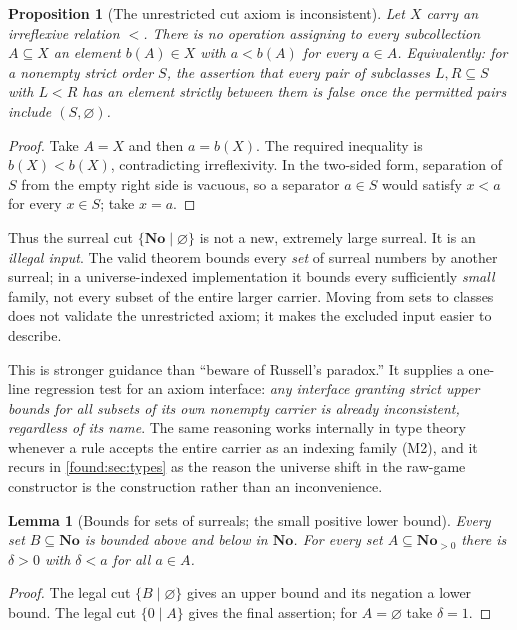 \documentclass[11pt,letterpaper]{article}
\numberwithin{equation}{section}
\newtheorem{proposition}[theorem]{Proposition}
\newtheorem{lemma}[theorem]{Lemma}
\theoremstyle{definition}
\theoremstyle{remark}
\newcommand{\No}{\mathbf{No}}
\begin{document}
\begin{proposition}[The unrestricted cut axiom is inconsistent]\label{found:prop:allcuts}
Let $X$ carry an irreflexive relation $<$. There is no operation assigning to
every subcollection $A\subseteq X$ an element $b(A)\in X$ with $a<b(A)$ for
every $a\in A$. Equivalently: for a nonempty strict order $S$, the assertion
that every pair of subclasses $L,R\subseteq S$ with $L<R$ has an element
strictly between them is false once the permitted pairs include
$(S,\varnothing)$.
\end{proposition}
\begin{proof}
Take $A=X$ and then $a=b(X)$. The required inequality is $b(X)<b(X)$,
contradicting irreflexivity. In the two-sided form, separation of $S$ from the
empty right side is vacuous, so a separator $a\in S$ would satisfy $x<a$ for
every $x\in S$; take $x=a$.
\end{proof}

Thus the surreal cut $\{\No\mid\varnothing\}$ is not a new, extremely large
surreal. It is an \emph{illegal input}. The valid theorem bounds every
\emph{set} of surreal numbers by another surreal; in a universe-indexed
implementation it bounds every sufficiently \emph{small} family, not every
subset of the entire larger carrier. Moving from sets to classes does not
validate the unrestricted axiom; it makes the excluded input easier to
describe.

This is stronger guidance than ``beware of Russell's paradox.'' It supplies a
one-line regression test for an axiom interface: \emph{any interface granting
strict upper bounds for all subsets of its own nonempty carrier is already
inconsistent, regardless of its name}. The same reasoning works internally in
type theory whenever a rule accepts the entire carrier as an indexing family
(M2), and it recurs in \cref{found:sec:types} as the reason the universe shift
in the raw-game constructor is the construction rather than an inconvenience.

\begin{lemma}[Bounds for sets of surreals; the small positive lower bound]\label{found:lem:bounds}
Every set $B\subseteq\No$ is bounded above and below in $\No$. For every set
$A\subseteq\No_{>0}$ there is $\delta>0$ with $\delta<a$ for all $a\in A$.
\end{lemma}
\begin{proof}
The legal cut $\{B\mid\varnothing\}$ gives an upper bound and its negation a
lower bound. The legal cut $\{0\mid A\}$ gives the final assertion; for
$A=\varnothing$ take $\delta=1$.
\end{proof}
\end{document}
